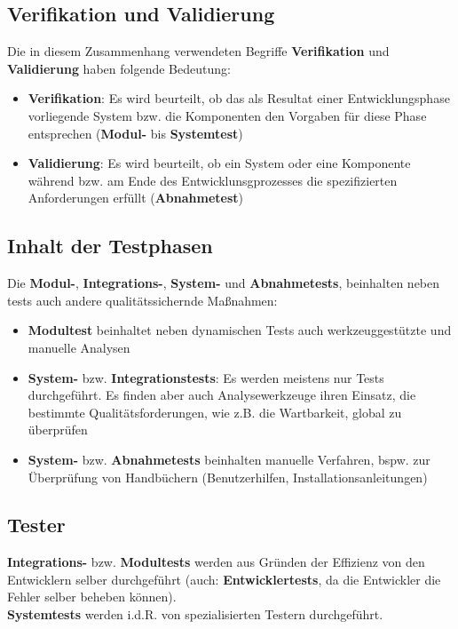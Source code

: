 \subsection*{Verifikation und Validierung}
Die in diesem Zusammenhang verwendeten Begriffe \textbf{Verifikation} und \textbf{Validierung} haben folgende Bedeutung:

\begin{itemize}
    \item \textbf{Verifikation}: Es wird beurteilt, ob das als Resultat einer Entwicklungsphase vorliegende System bzw. die Komponenten den Vorgaben für diese Phase entsprechen (\textbf{Modul-} bis \textbf{Systemtest})
    \item \textbf{Validierung}: Es wird beurteilt, ob ein System oder eine Komponente während bzw. am Ende des Entwicklunsgprozesses die spezifizierten Anforderungen erfüllt (\textbf{Abnahmetest})
\end{itemize}

\subsection*{Inhalt der Testphasen}
Die \textbf{Modul-}, \textbf{Integrations-}, \textbf{System-} und \textbf{Abnahmetests}, beinhalten neben tests auch andere qualitätssichernde Maßnahmen:

\begin{itemize}
    \item \textbf{Modultest} beinhaltet neben dynamischen Tests auch werkzeuggestützte und manuelle Analysen
    \item \textbf{System-} bzw. \textbf{Integrationstests}: Es werden meistens nur Tests durchgeführt. Es finden aber auch Analysewerkzeuge ihren Einsatz, die bestimmte Qualitätsforderungen, wie z.B. die Wartbarkeit, global zu überprüfen
    \item \textbf{System-} bzw. \textbf{Abnahmetests} beinhalten manuelle Verfahren, bspw. zur Überprüfung von Handbüchern (Benutzerhilfen, Installationsanleitungen)
\end{itemize}

\subsection*{Tester}
\textbf{Integrations-} bzw. \textbf{Modultests} werden aus Gründen der Effizienz von den Entwicklern selber durchgeführt (auch: \textbf{Entwicklertests}, da die Entwickler die Fehler selber beheben können).\\
\textbf{Systemtests} werden i.d.R. von spezialisierten Testern durchgeführt.

